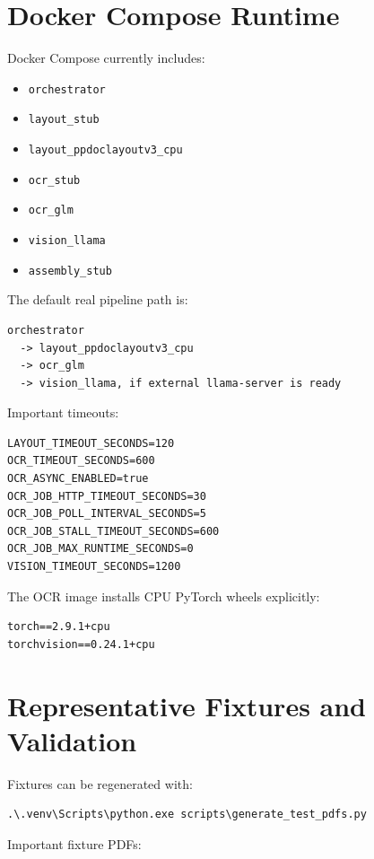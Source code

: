 \documentclass[11pt,a4paper]{article}
\begin{document}
\section{Docker Compose Runtime}

Docker Compose currently includes:

\begin{itemize}[leftmargin=1.2cm]
\item \texttt{orchestrator}
\item \texttt{layout\_stub}
\item \texttt{layout\_ppdoclayoutv3\_cpu}
\item \texttt{ocr\_stub}
\item \texttt{ocr\_glm}
\item \texttt{vision\_llama}
\item \texttt{assembly\_stub}
\end{itemize}

The default real pipeline path is:

\begin{lstlisting}
orchestrator
  -> layout_ppdoclayoutv3_cpu
  -> ocr_glm
  -> vision_llama, if external llama-server is ready
\end{lstlisting}

Important timeouts:

\begin{lstlisting}
LAYOUT_TIMEOUT_SECONDS=120
OCR_TIMEOUT_SECONDS=600
OCR_ASYNC_ENABLED=true
OCR_JOB_HTTP_TIMEOUT_SECONDS=30
OCR_JOB_POLL_INTERVAL_SECONDS=5
OCR_JOB_STALL_TIMEOUT_SECONDS=600
OCR_JOB_MAX_RUNTIME_SECONDS=0
VISION_TIMEOUT_SECONDS=1200
\end{lstlisting}

The OCR image installs CPU PyTorch wheels explicitly:

\begin{lstlisting}
torch==2.9.1+cpu
torchvision==0.24.1+cpu
\end{lstlisting}

\section{Representative Fixtures and Validation}

Fixtures can be regenerated with:

\begin{lstlisting}
.\.venv\Scripts\python.exe scripts\generate_test_pdfs.py
\end{lstlisting}

Important fixture PDFs:
\end{document}
